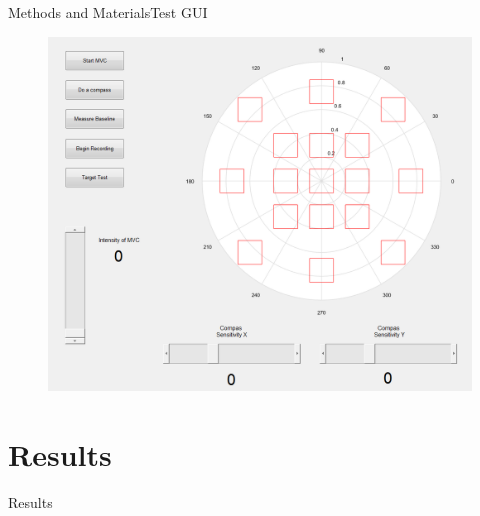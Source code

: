 \documentclass[10pt]{beamer}
\begin{document}
\begin{frame}{Methods and Materials}{Test GUI}
\begin{figure}
	\includegraphics[scale=0.3]{figures/PlacesToGo.png}
\end{figure}
\end{frame}


\section{Results}
\begin{frame}{Results}

\end{frame}

\end{document}
